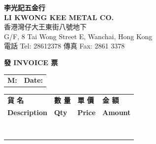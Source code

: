 \documentclass[UTF8, fontset=none]{ctexrep}
\begin{document}
\pagestyle{empty}

\vfill
\begin{center}
\begin{minipage}{0.85\paperwidth}

\vspace{0.2cm}

\begin{center}
{\Large \textbf{李光記五金行}} \\[2pt]
{\small \textbf{LI KWONG KEE METAL CO.}} \\[3pt]
{\footnotesize 香港灣仔大王東街八號地下 \\
G/F, 8 Tai Wong Street E, Wanchai, Hong Kong} \\[3pt]
{\footnotesize 電話 Tel: 28612378 \quad 傳真 Fax: 2861 3378}
\end{center}


\vspace{-0.4cm}

\begin{center}
{\large \textbf{發 INVOICE 票}}
\end{center}

\begin{center}
\begin{tabular*}{0.86\linewidth}{@{\extracolsep{\fill}}lr}
\textbf{M:} \underline{\hspace{4.5cm}} &
\textbf{Date:} \underline{\hspace{3cm}} \\
\end{tabular*}
\end{center}

\vspace{0.3cm}

\noindent
\begin{center}
\begin{tabularx}{0.86\linewidth}{|p{4.4cm}|p{1.35cm}|p{1.6cm}|p{1.71cm}|}
\hline
\centering \textbf{貨 名} &
\centering \textbf{數 量} &
\centering \textbf{單 價} &
\centering \textbf{金 額} \tabularnewline

\centering \textbf{Description} &
\centering \textbf{Qty} &
\centering \textbf{Price} &
\centering \textbf{Amount} \tabularnewline
\hline

& & &\\ \hline
& & &\\ \hline
& & &\\ \hline
& & &\\ \hline
& & &\\ \hline
& & &\\ \hline
& & &\\ \hline
& & &\\ \hline


\end{tabularx}
\end{center}
\end{minipage}
\end{center}
\end{document}
